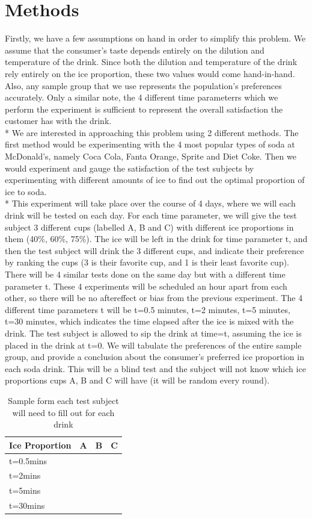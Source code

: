 \documentclass[oneside,12pt]{report}
\def\prefacesection#1{
\chapter*{#1}
\addcontentsline{toc}{chapter}{#1}
}
\begin{document}
%

\prefacesection{Methods}

Firstly, we have a few assumptions on hand in order to simplify this problem. We assume that the consumer's taste depends entirely on the dilution and temperature of the drink. Since both the dilution and temperature of the drink rely entirely on the ice proportion, these two values would come hand-in-hand. Also, any sample group that we use represents the population's preferences accurately. Only a similar note, the 4 different time parameterrs which we perform the experiment is sufficient to represent the overall satisfaction the customer has with the drink.
\\* We are interested in approaching this problem using 2 different methods. The first method would be experimenting with the 4 most popular types of soda at McDonald's, namely Coca Cola, Fanta Orange, Sprite and Diet Coke. Then we would experiment and gauge the satisfaction of the test subjects by experimenting with different amounts of ice to find out the optimal proportion of ice to soda. 
\\* This experiment will take place over the course of 4 days, where we will each drink will be tested on each day. For each time parameter, we will give the test subject 3 different cups (labelled A, B and C) with different ice proportions in them (40\%, 60\%, 75\%). The ice will be left in the drink for time parameter t, and then the test subject will drink the 3 different cups, and indicate their preference by ranking the cups (3 is their favorite cup, and 1 is their least favorite cup). There will be 4 similar tests done on the same day but with a different time parameter t. These 4 experiments will be scheduled an hour apart from each other, so there will be no aftereffect or bias from the previous experiment. 
The 4 different time parameters t will be t=0.5 minutes, t=2 minutes, t=5 minutes, t=30 minutes, which indicates the time elapsed after the ice is mixed with the drink. The test subject is allowed to sip the drink at time=t, assuming the ice is placed in the drink at t=0. We will tabulate the preferences of the entire sample group, and provide a conclusion about the consumer's preferred ice proportion in each soda drink.
This will be a blind test and the subject will not know which ice proportions cups A, B and C will have (it will be random every round). \pagebreak
\vspace{2pt}
\begin{table}[ h]
\centering
\begin{tabular}{ l | c|c|c }
  Ice Proportion & A  & B & C  \\
\hline  
t=0.5mins & & &\\ 
\hline  
t=2mins & & &\\ 
\hline  
t=5mins  & & &\\ 
\hline  
t=30mins & & &\\ 
\hline  
   
 \end{tabular}
\caption{Sample form each test subject will need to fill out for each drink}

\end{table}
\end{document}
